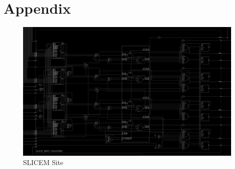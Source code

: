 \documentclass[twocolumn]{article}
\begin{document}

\section{Appendix}

    \begin{figure}[b]
        \centering
        \includegraphics[width=\textwidth]{figures/slicem.png}
        \caption{SLICEM Site}
        \label{fig:slicem}
    \end{figure}
\end{document}
